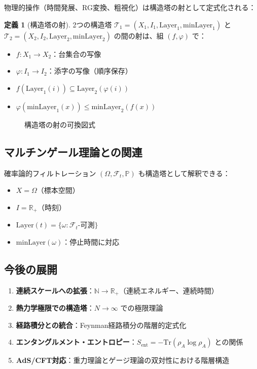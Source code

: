 \documentclass[a4paper,12pt]{ltjsarticle}
\theoremstyle{definition}
\newtheorem{definition}[theorem]{定義}
\newcommand{\R}{\mathbb{R}}
\newcommand{\N}{\mathbb{N}}
\newcommand{\Layer}{\mathrm{Layer}}
\newcommand{\minLayer}{\mathrm{minLayer}}
\begin{document}
物理的操作（時間発展、RG変換、粗視化）は構造塔の射として定式化される：

\begin{definition}[構造塔の射]
2つの構造塔 $\mathcal{T}_1 = (X_1, I_1, \Layer_1, \minLayer_1)$ と
$\mathcal{T}_2 = (X_2, I_2, \Layer_2, \minLayer_2)$ の間の射は、組 $(f, \varphi)$ で：
\begin{itemize}
  \item $f : X_1 \to X_2$：台集合の写像
  \item $\varphi : I_1 \to I_2$：添字の写像（順序保存）
  \item $f(\Layer_1(i)) \subseteq \Layer_2(\varphi(i))$
  \item $\varphi(\minLayer_1(x)) \leq \minLayer_2(f(x))$
\end{itemize}
\end{definition}

\begin{figure}[h]
\centering
{}
\caption{構造塔の射の可換図式}
\end{figure}

\subsection{マルチンゲール理論との関連}

確率論的フィルトレーション $(\Omega, \mathcal{F}_t, \mathbb{P})$ も構造塔として解釈できる：
\begin{itemize}
  \item $X = \Omega$（標本空間）
  \item $I = \R_+$（時刻）
  \item $\Layer(t) = \{ \omega : \mathcal{F}_t\text{-可測} \}$
  \item $\minLayer(\omega)$：停止時間に対応
\end{itemize}

\subsection{今後の展開}

\begin{enumerate}
  \item \textbf{連続スケールへの拡張}：$\N \to \R_+$（連続エネルギー、連続時間）
  \item \textbf{熱力学極限での構造塔}：$N \to \infty$ での極限理論
  \item \textbf{経路積分との統合}：Feynman経路積分の階層的定式化
  \item \textbf{エンタングルメント・エントロピー}：$S_{\mathrm{ent}} = -\mathrm{Tr}(\rho_A \log \rho_A)$ との関係
  \item \textbf{AdS/CFT対応}：重力理論とゲージ理論の双対性における階層構造
\end{enumerate}
\end{document}
